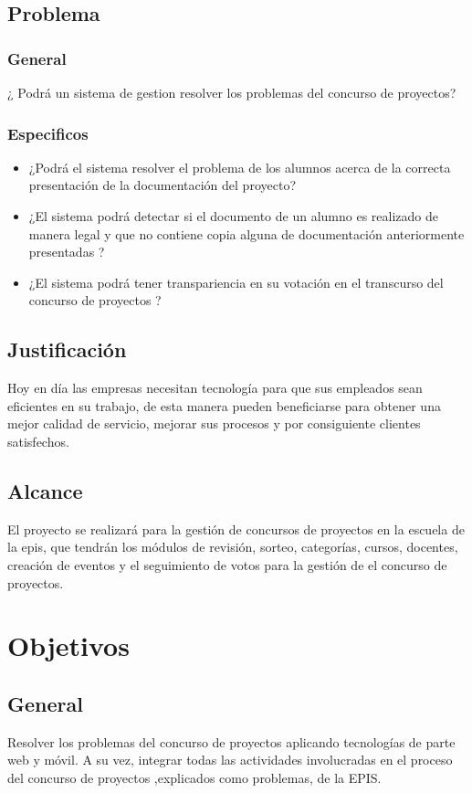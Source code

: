 \documentclass[%
 reprint,
 amsmath,amssymb,
 aps,
]{revtex4-1}
\begin{document}
\subsection{Problema}
\subsubsection{General}
¿ Podrá un sistema de gestion resolver los problemas del concurso de proyectos?
\subsubsection{Especificos}
\begin{itemize}
\item ¿Podrá el sistema resolver el problema de los alumnos acerca de la correcta presentación de la documentación del proyecto?
\item ¿El sistema podrá detectar si el documento de un alumno es realizado de manera legal y que no contiene copia alguna de documentación anteriormente presentadas ?
\item ¿El sistema podrá tener transpariencia en su votación en el transcurso del concurso de proyectos ?
\end{itemize}
\subsection{Justificación}
Hoy en día las empresas necesitan tecnología para que sus empleados sean eficientes en su trabajo, de esta manera pueden beneficiarse para obtener una mejor calidad de servicio, mejorar sus procesos y por consiguiente clientes satisfechos.

\subsection{Alcance}
El proyecto se realizará para la gestión de concursos de proyectos en la escuela de la epis, que tendrán los módulos de revisión, sorteo, categorías, cursos, docentes, creación de eventos y el seguimiento de votos para la gestión de el concurso de proyectos. 

\section {Objetivos}
\subsection {General}
Resolver los problemas del concurso de proyectos aplicando tecnologías de parte web y móvil. A su vez, integrar todas las actividades involucradas en el proceso del concurso de proyectos ,explicados como problemas, de la EPIS.
\end{document}

